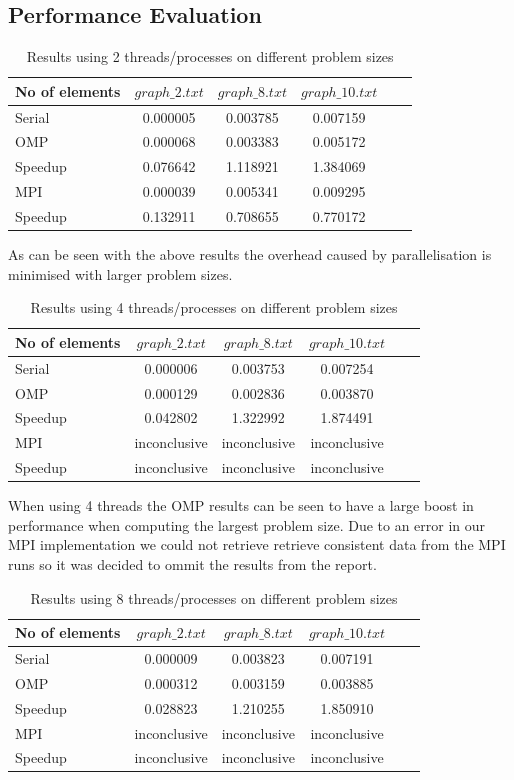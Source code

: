 \subsection{Performance Evaluation}
\begin{table}[htb]
	\centering
	\caption{Results using 2 threads/processes on different problem sizes}
	\begin{tabular}{l|ccccc}
		\toprule
		No of elements& $graph\_2.txt$ & $graph\_8.txt$ & $graph\_10.txt$\\
		\midrule
		Serial 	&0.000005	&0.003785&0.007159\\
		OMP 	&0.000068	&0.003383&0.005172\\
		Speedup &0.076642	&1.118921&1.384069\\
		MPI 	&0.000039	&0.005341&0.009295\\
		Speedup &0.132911	&0.708655&0.770172\\
		\bottomrule
	\end{tabular}
\end{table}
As can be seen with the above results the overhead caused by parallelisation is minimised with larger problem sizes.  
\begin{table}[htb]
	\centering
	\caption{Results using 4 threads/processes on different problem sizes}
	\begin{tabular}{l|ccccc}
		\toprule
		No of elements& $graph\_2.txt$ & $graph\_8.txt$ & $graph\_10.txt$\\
		\midrule
		Serial 	&0.000006		&0.003753&0.007254\\
		OMP 	&0.000129		&0.002836&0.003870\\
		Speedup &0.042802		&1.322992&1.874491\\
		MPI 	&inconclusive	&inconclusive&inconclusive\\
		Speedup &inconclusive	&inconclusive&inconclusive\\
		\bottomrule
	\end{tabular}
\end{table}
\pagebreak
When using 4 threads the OMP results can be seen to have a large boost in performance when computing the largest problem size. Due to an error in our MPI implementation we could not retrieve retrieve consistent data from the MPI runs so it was decided to ommit the results from the report.
\begin{table}[htb]
	\centering
	\caption{Results using 8 threads/processes on different problem sizes}
	\begin{tabular}{l|ccccc}
		\toprule
		No of elements& $graph\_2.txt$ & $graph\_8.txt$ & $graph\_10.txt$\\
		\midrule
		Serial 	&0.000009		&0.003823&0.007191\\
		OMP 	&0.000312		&0.003159&0.003885\\
		Speedup &0.028823		&1.210255&1.850910\\
		MPI 	&inconclusive	&inconclusive&inconclusive\\
		Speedup &inconclusive	&inconclusive&inconclusive\\
		\bottomrule
	\end{tabular}
\end{table}
